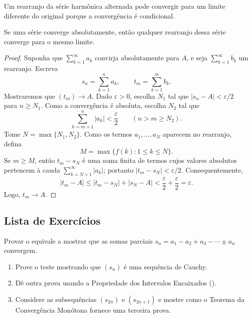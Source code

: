 Um rearranjo da série harmônica alternada pode convergir para um limite diferente do original porque a convergência é condicional.

\begin{theorem}\label{thm:rearranjo-convergencia-absoluta}
Se uma série converge absolutamente, então qualquer rearranjo dessa série converge para o mesmo limite.
\end{theorem}

\begin{proof}
Suponha que $\sum_{k=1}^{\infty}a_k$ convirja absolutamente para $A$, e seja $\sum_{k=1}^{\infty}b_k$ um rearranjo. Escreva
\[
s_n=\sum_{k=1}^na_k,\qquad t_m=\sum_{k=1}^mb_k.
\]
Mostraremos que $(t_m)\to A$. Dado $\varepsilon>0$, escolha $N_1$ tal que $|s_n-A|<\varepsilon/2$ para $n\geq N_1$. Como a convergência é absoluta, escolha $N_2$ tal que
\[
\sum_{k=m+1}^n|a_k|<\frac\varepsilon2\qquad(n>m\geq N_2).
\]
Tome $N=\max\{N_1,N_2\}$. Como os termos $a_1,\ldots,a_N$ aparecem no rearranjo, defina
\[
M=\max\{f(k):1\leq k\leq N\}.
\]
Se $m\geq M$, então $t_m-s_N$ é uma soma finita de termos cujos valores absolutos pertencem à cauda $\sum_{k=N+1}^{\infty}|a_k|$; portanto $|t_m-s_N|<\varepsilon/2$. Consequentemente,
\[
|t_m-A|\leq|t_m-s_N|+|s_N-A|<\frac\varepsilon2+\frac\varepsilon2=\varepsilon.
\]
Logo, $t_m\to A$.
\end{proof}

\bigskip 

\subsection{Lista de Exercícios}\label{subsec:exercicios-propriedades-series}

\begin{exercise}\label{ex:2-7-1}
Provar o  equivale a mostrar que as somas parciais $s_n=a_1-a_2+a_3-\cdots\pm a_n$ convergem.
\begin{enumerate}[label=\alph*)]
\item Prove o teste mostrando que $(s_n)$ é uma sequência de Cauchy.
\item Dê outra prova usando a Propriedade dos Intervalos Encaixados ().
\item Considere as subsequências $(s_{2n})$ e $(s_{2n+1})$ e mostre como o Teorema da Convergência Monótona fornece uma terceira prova.
\end{enumerate}
\end{exercise}

